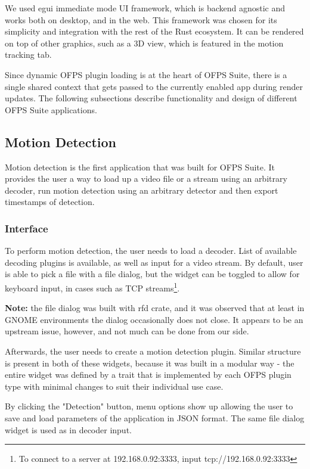 \documentclass[11pt,english]{report}
\begin{document}
We used egui\cite{egui} immediate mode UI framework, which is backend agnostic and works both on desktop, and in the web. This framework was chosen for its simplicity and integration with the rest of the Rust ecosystem. It can be rendered on top of other graphics, such as a 3D view, which is featured in the motion tracking tab.

Since dynamic OFPS plugin loading is at the heart of OFPS Suite, there is a single shared context that gets passed to the currently enabled app during render updates. The following subsections describe functionality and design of different OFPS Suite applications.

\subsection{Motion Detection}

Motion detection is the first application that was built for OFPS Suite. It provides the user a way to load up a video file or a stream using an arbitrary decoder, run motion detection using an arbitrary detector and then export timestamps of detection.

\subsubsection{Interface}

To perform motion detection, the user needs to load a decoder. List of available decoding plugins is available, as well as input for a video stream. By default, user is able to pick a file with a file dialog, but the widget can be toggled to allow for keyboard input, in cases such as TCP streams\footnote{To connect to a server at 192.168.0.92:3333, input tcp://192.168.0.92:3333}.

\textbf{Note:} the file dialog was built with rfd crate, and it was observed that at least in GNOME environments the dialog occasionally does not close. It appears to be an upstream issue, however, and not much can be done from our side.

Afterwards, the user needs to create a motion detection plugin. Similar structure is present in both of these widgets, because it was built in a modular way - the entire widget was defined by a trait that is implemented by each OFPS plugin type with minimal changes to suit their individual use case. 

By clicking the "Detection" button, menu options show up allowing the user to save and load parameters of the application in JSON format. The same file dialog widget is used as in decoder input.
\end{document}
